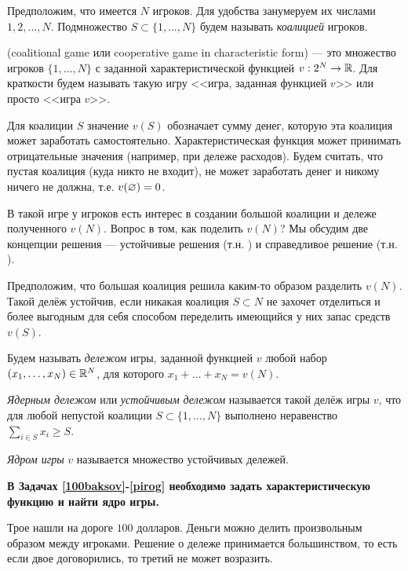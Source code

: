 \documentclass[a4paper,12pt]{article}
\begin{document}

{}

Предположим, что имеется $N$ игроков. Для удобства занумеруем их числами $1,2,\ldots,N$. Подмножество $S \subset \{1,\ldots,N\}$  будем называть
\textit{коалицией} игроков.

 (coalitional game или cooperative game in characteristic form) --- это множество игроков
$\{1,\ldots,N\}$ с заданной характеристической функцией $v : 2^N \rightarrow \mathbb{R}$. Для краткости будем называть такую игру <<игра, заданная функцией $v$>> или просто <<игра $v$>>.

Для  коалиции $S$ значение $v(S)$ обозначает сумму денег, которую эта коалиция
может заработать самостоятельно. Характеристическая функция может принимать отрицательные значения (например, при дележе расходов). Будем считать, что пустая коалиция (куда никто не входит), не может заработать денег и никому ничего не должна, т.е. $v(\varnothing)=0$.

В такой игре у игроков есть интерес в создании большой коалиции и дележе
полученного $v(N)$. Вопрос в том, как поделить $v(N)$? Мы обсудим две концепции решения --- устойчивые решения (т.н. ) и справедливое решение
(т.н. ).


Предположим, что большая коалиция решила каким-то образом разделить $v(N)$. Такой делёж устойчив, если никакая коалиция $S \subset N$ не захочет отделиться и более выгодным для себя способом переделить имеющийся у них запас средств $v(S)$.

 Будем называть {\it дележом} игры, заданной функцией $v$ любой набор $(x_1,\ldots,x_N) \in \mathbb{R}^N$, для которого $x_1+\ldots+x_N = v(N)$.

{\it Ядерным дележом}  или {\it устойчивым дележом} называется такой делёж игры $v$, что для любой непустой коалиции $S \subset \{1,\ldots,N\}$  выполнено неравенство $\sum_{i \in S}x_i \geq S$.

{\it Ядром игры} $v$ называется множество устойчивых дележей.

{\bf В  Задачах \ref{100baksov}-\ref{pirog} необходимо задать характеристическую функцию и найти ядро игры.}

\label{100baksov} Трое нашли на дороге $100$ долларов. Деньги можно делить произвольным образом между игроками. Решение о дележе принимается большинством, то есть если двое договорились, то третий не может возразить.
\end{document}
